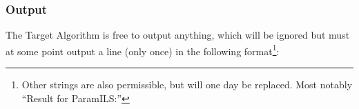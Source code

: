 \documentclass[manual.tex]{subfiles}
\begin{document}
\subsubsection{Output}\label{sec:wrapper_output}

The Target Algorithm is free to output anything, which will be ignored
but must at some point output a line (only once) in the following
format\footnote{Other strings are also permissible, but will one day be replaced. Most notably ``Result for ParamILS:''}:%



\end{document}
